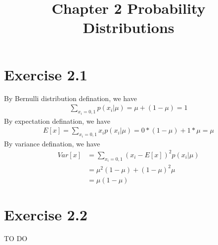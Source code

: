 \documentclass{article}
\title{Chapter 2 Probability Distributions}
\author{}
\date{}
\begin{document}
\maketitle
\section{Exercise 2.1}
By Bernulli distribution defination, we have
\begin{align}
    \sum_{x_i=0, 1} p(x_i|\mu) = \mu + (1 - \mu) = 1
\end{align}
By expectation defination, we have
\begin{align}
    E[x] = \sum_{x_i=0, 1} x_ip(x_i|\mu) = 0 * (1 - \mu) + 1 * \mu=\mu
\end{align}
By variance defination, we have
\begin{align}
    Var[x] & = \sum_{x_i=0, 1} (x_i - E[x])^2p(x_i|\mu) \\
    & = \mu^2 (1 - \mu) + (1 - \mu)^2 \mu \\
    & = \mu (1 - \mu)
\end{align}
\section{Exercise 2.2}
TO DO 
\end{document}
